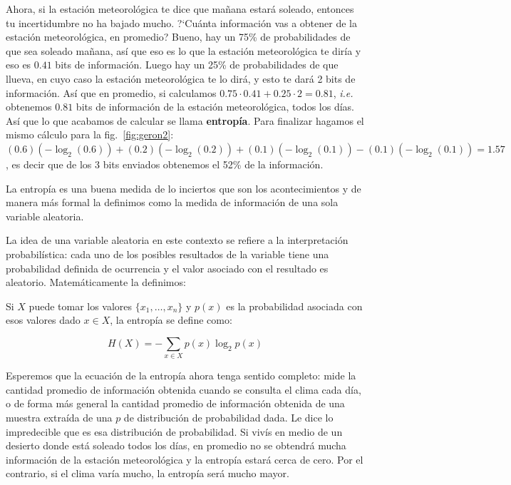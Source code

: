 \documentclass[a4paper,12pt]{article}
\begin{document}
Ahora, si la estación meteorológica te dice que mañana estará soleado, entonces tu incertidumbre no ha bajado mucho. ?`Cuánta información vas a obtener de la estación meteorológica, en promedio? Bueno, hay un 75\% de probabilidades de que sea soleado mañana, así que eso es lo que la estación meteorológica te diría y eso es $0.41$ bits de información. Luego hay un 25\% de probabilidades de que llueva, en cuyo caso la estación meteorológica te lo dirá, y esto te dará 2 bits de información. Así que en promedio, si calculamos $0.75\cdot 0.41 + 0.25 \cdot 2 = 0.81$, \textit{i.e.} obtenemos $0.81$ bits de información de la estación meteorológica, todos los días. Así que lo que acabamos de calcular se llama \textbf{entropía}. Para finalizar hagamos el mismo cálculo para la fig.~\ref{fig:geron2}: $(0.6)(-\log_2(0.6))+(0.2)(-\log_2(0.2))+(0.1)(-\log_2(0.1))-(0.1)(-\log_2(0.1))=1.57$, es decir que de los 3 bits enviados obtenemos el 52\% de la información. 

La entropía es una buena medida de lo inciertos que son los acontecimientos y de manera más formal la definimos como la medida de información de una sola variable aleatoria. 

\clearpage

La idea de una variable aleatoria en este contexto se refiere a la interpretación probabilística: cada uno de los posibles resultados de la variable tiene una probabilidad definida de ocurrencia y el valor asociado con el resultado es aleatorio. Matemáticamente la definimos:

Si $X$ puede tomar los valores $\{x_1, \dots, x_n\}$ y $p(x)$ es la probabilidad asociada con esos valores dado $x \in X$, la entropía se define como:

$$H(X) = - \sum_{x \in X} p(x) \log_2 p(x)$$

Esperemos que la ecuación de la entropía ahora tenga sentido completo: mide la cantidad promedio de información obtenida cuando se consulta el clima cada día, o  de forma más general la cantidad promedio de información obtenida de una muestra extraída de una $p$ de distribución de probabilidad dada. Le dice lo impredecible que es esa distribución de probabilidad. Si vivís en medio de un desierto donde está soleado todos los días, en promedio no se obtendrá mucha información de la estación meteorológica y la entropía estará cerca de cero. Por el contrario, si el clima varía mucho, la entropía será mucho mayor.

\end{document}
